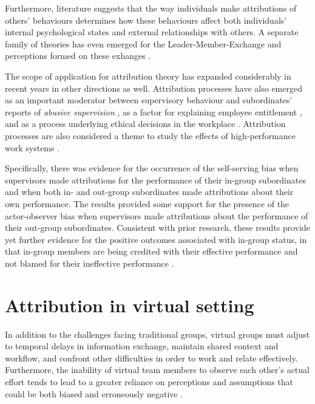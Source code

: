 Furthermore, literature \cite{Gardner2018} suggests that the way individuals make attributions of others' behaviours determines how these behaviours affect both individuals' internal psychological states and external relationships with others.  A separate family of theories has even emerged for the Leader-Member-Exchange and perceptions formed on these exhanges \cite{Cogliser2009}.

The scope of application for attribution theory has expanded considerably in recent years in other directions as well. Attribution processes have also emerged as an important moderator between supervisory behaviour and subordinates' reports of \textit{abusive supervision} \cite{Mackey2017}, as a factor for explaining employee entitlement \cite{Harvey2013}, and as a process underlying ethical decisions in the workplace \cite{Harvey2017}.  Attribution processes are also considered a theme to study the effects of high‐performance work systems \cite{Mackey2016}. 

Specifically, there was evidence for the occurrence of the self-serving bias when supervisors made attributions for the performance of their in-group subordinates and when both in- and out-group subordinates made attributions about their own performance. The results provided some support for the presence of the actor-observer bias when supervisors made attributions about the performance of their out-group subordinates. Consistent with prior research, these results provide yet further evidence for the positive outcomes associated with in-group status, in that in-group members are being credited with their effective performance and not blamed for their ineffective performance \cite{Campbell2006}.


\section{Attribution in virtual setting}\label{AtrVirtual}


In addition to the challenges facing traditional groups, virtual groups must adjust to temporal delays in information exchange, maintain shared context and workflow, and confront other difficulties in order to work and relate effectively.  Furthermore, the inability of virtual team members to observe each other's actual effort tends to lead to a greater reliance on perceptions and assumptions that could be both biased and erroneously negative \cite{Penarroja2013}.

